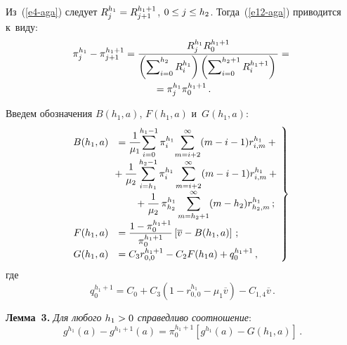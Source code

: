 \begin{multicols}{2}
  Из~(\ref{e4-aga}) следует $R_j^{h_1}\hm= R_{j+1}^{h_1+1}$, $0\hm\leq 
j\hm\leq h_2$. Тогда~(\ref{e12-aga}) приводится к~виду:
  \begin{multline*}
  \pi_j^{h_1}-\pi_{j+1}^{h_1+1} = \displaystyle\frac{\displaystyle R_j^{h_1} R_0^{h_1+1}\mathstrut}{\displaystyle \left(\sum\nolimits_{i=0}^{h_2} R_i^{h_1}\right) \left(\sum\nolimits^{h_2+1}_{i=0} 
R_i^{h_1+1}\right)\mathstrut} ={}\\
{}=\pi_j^{h_1} \pi_0^{h_1+1}\,.
  \end{multline*}
  
  Введем обозначения $B(h_1,a)$, $F(h_1,a)$ и~$G(h_1,a)$:
  \begin{equation}
\left.
\begin{array}{rl}
    \hspace*{-3.4mm}B(h_1,a) &=\displaystyle \fr{1}{\mu_1} \!\!\sum\limits_{i=0}^{h_1-1} 
\pi_i^{h_1}\!\sum\limits^\infty_{m=i+2} (m-i-1) r^{h_1}_{i,m} +{}\\[6pt]
  &\hspace*{-2mm}{}+\fr{1}{\mu_2} 
 \sum\limits_{i=h_1}^{h_2-1} \pi_i^{h_1} \sum\limits^\infty_{m=i+2} (m-i-1) r_{i,m}^{h_1} 
+{}\\[6pt]
  &\hspace*{6mm}{}+
\fr{1}{\mu_2}\,\pi^{h_1}_{h_2} \displaystyle \sum\limits^\infty_{m=h_2+1} (m-h_2) r^{h_1}_{h_2,m}\,;\\[6pt]
    \hspace*{-3.4mm}F(h_1,a)&=\fr{1-\pi_0^{h_1+1}}{\pi_0^{h_1+1}} \left[ \overline{v}-B(h_1,a)\right]\,;\\[9pt]
   \hspace*{-3.4mm} G(h_1,a)&=C_3 r^{h_1+1}_{0,0} -C_2 F(h_1a) +q_0^{h_1+1}\,,
   \end{array}
\!\!  \right\}\!
  \label{e13-aga}
  \end{equation}
  где
  $$ 
   q_0^{h_1+1} = C_0+C_3\left( 1-r^{h_1}_{0,0} -\mu_1\overline{v}\right)-
C_{1,4}\overline{v}\,.
 $$
  
  \noindent
  \textbf{Лемма~3.} \textit{Для любого $h_1\hm>0$ справедливо 
соотношение}:
  \begin{equation}
  g^{h_1}(a)-g^{h_1+1}(a)=\pi_0^{h_1+1} \left[ g^{h_1}(a)-G(h_1,a)\right]\,.
  \label{e14-aga}
  \end{equation}
  

\end{multicols}
